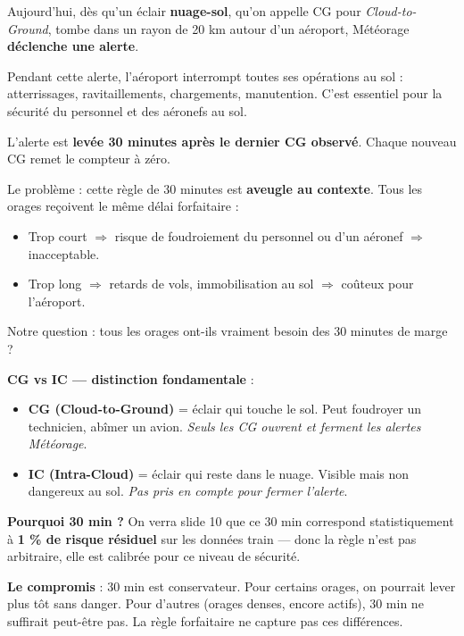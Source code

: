 \documentclass[11pt,a4paper]{article}
\begin{document}
\begin{dire}
\og Aujourd'hui, dès qu'un éclair \textbf{nuage-sol}, qu'on appelle CG pour
\emph{Cloud-to-Ground}, tombe dans un rayon de 20 km autour d'un aéroport, Météorage
\textbf{déclenche une alerte}.

Pendant cette alerte, l'aéroport interrompt toutes ses opérations au sol : atterrissages,
ravitaillements, chargements, manutention. C'est essentiel pour la sécurité du personnel
et des aéronefs au sol.

L'alerte est \textbf{levée 30 minutes après le dernier CG observé}. Chaque nouveau CG
remet le compteur à zéro.

Le problème : cette règle de 30 minutes est \textbf{aveugle au contexte}. Tous les orages
reçoivent le même délai forfaitaire :
\begin{itemize}[topsep=2pt]
    \item Trop court $\Rightarrow$ risque de foudroiement du personnel ou d'un aéronef
    $\Rightarrow$ inacceptable.
    \item Trop long $\Rightarrow$ retards de vols, immobilisation au sol $\Rightarrow$
    coûteux pour l'aéroport.
\end{itemize}

Notre question : tous les orages ont-ils vraiment besoin des 30 minutes de marge ? \fg{}
\end{dire}

\begin{compr}
\textbf{CG vs IC — distinction fondamentale} :
\begin{itemize}[topsep=2pt]
    \item \textbf{CG (Cloud-to-Ground)} = éclair qui touche le sol. Peut foudroyer un
    technicien, abîmer un avion. \emph{Seuls les CG ouvrent et ferment les alertes Météorage}.
    \item \textbf{IC (Intra-Cloud)} = éclair qui reste dans le nuage. Visible mais
    non dangereux au sol. \emph{Pas pris en compte pour fermer l'alerte}.
\end{itemize}

\textbf{Pourquoi 30 min ?} On verra slide 10 que ce 30 min correspond statistiquement à
\textbf{1 \% de risque résiduel} sur les données train — donc la règle n'est pas
arbitraire, elle est calibrée pour ce niveau de sécurité.

\textbf{Le compromis} : 30 min est conservateur. Pour certains orages, on pourrait lever
plus tôt sans danger. Pour d'autres (orages denses, encore actifs), 30 min ne suffirait
peut-être pas. La règle forfaitaire ne capture pas ces différences.
\end{compr}
\end{document}
